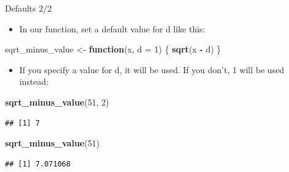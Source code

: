 \documentclass[
  ignorenonframetext,
]{beamer}
\newenvironment{Shaded}{\begin{snugshade}}{\end{snugshade}}
\newcommand{\ControlFlowTok}[1]{\textcolor[rgb]{0.13,0.29,0.53}{\textbf{#1}}}
\newcommand{\DataTypeTok}[1]{\textcolor[rgb]{0.13,0.29,0.53}{#1}}
\newcommand{\DecValTok}[1]{\textcolor[rgb]{0.00,0.00,0.81}{#1}}
\newcommand{\KeywordTok}[1]{\textcolor[rgb]{0.13,0.29,0.53}{\textbf{#1}}}
\newcommand{\NormalTok}[1]{#1}
\newcommand{\OperatorTok}[1]{\textcolor[rgb]{0.81,0.36,0.00}{\textbf{#1}}}
\newcommand{\StringTok}[1]{\textcolor[rgb]{0.31,0.60,0.02}{#1}}
\providecommand{\tightlist}{%
  \setlength{\itemsep}{0pt}\setlength{\parskip}{0pt}}
\begin{document}
\begin{frame}[fragile]{Defaults 2/2}
\protect\hypertarget{defaults-22}{}

\begin{itemize}
\tightlist
\item
  In our function, set a default value for d like this:
\end{itemize}

\begin{Shaded}
\begin{Highlighting}[]
\NormalTok{sqrt_minus_value <-}\StringTok{ }\ControlFlowTok{function}\NormalTok{(x, }\DataTypeTok{d =} \DecValTok{1}\NormalTok{) \{}
  \KeywordTok{sqrt}\NormalTok{(x }\OperatorTok{-}\StringTok{ }\NormalTok{d)}
\NormalTok{\}}
\end{Highlighting}
\end{Shaded}

\begin{itemize}
\tightlist
\item
  If you specify a value for d, it will be used. If you don't, 1 will be
  used instead:
\end{itemize}

\begin{Shaded}
\begin{Highlighting}[]
\KeywordTok{sqrt_minus_value}\NormalTok{(}\DecValTok{51}\NormalTok{, }\DecValTok{2}\NormalTok{)}
\end{Highlighting}
\end{Shaded}

\begin{verbatim}
## [1] 7
\end{verbatim}

\begin{Shaded}
\begin{Highlighting}[]
\KeywordTok{sqrt_minus_value}\NormalTok{(}\DecValTok{51}\NormalTok{)}
\end{Highlighting}
\end{Shaded}

\begin{verbatim}
## [1] 7.071068
\end{verbatim}

\end{frame}
\end{document}
